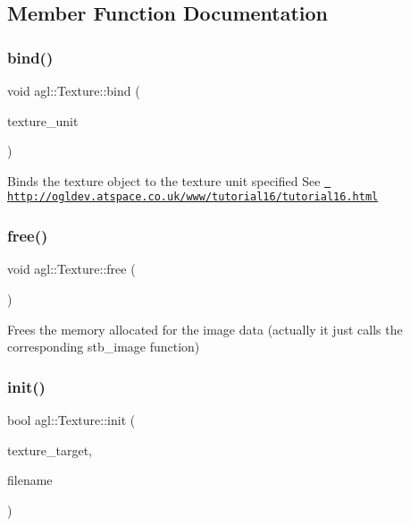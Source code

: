 \subsection{Member Function Documentation}
\mbox{\label{classagl_1_1Texture_a9f0f84d3edab9c07d0c1580e7647fbb9}} 
\subsubsection{\texorpdfstring{bind()}{bind()}}
{\footnotesize\ttfamily void agl\+::\+Texture\+::bind (\begin{DoxyParamCaption}\item[{G\+Lenum}]{texture\+\_\+unit }\end{DoxyParamCaption})}

Binds the texture object to the texture unit specified See \href{http://ogldev.atspace.co.uk/www/tutorial16/tutorial16.html}{\texttt{ http\+://ogldev.\+atspace.\+co.\+uk/www/tutorial16/tutorial16.\+html}} \mbox{\label{classagl_1_1Texture_aed12d98a17d4eeeb851cad6c81abbada}} 
\subsubsection{\texorpdfstring{free()}{free()}}
{\footnotesize\ttfamily void agl\+::\+Texture\+::free (\begin{DoxyParamCaption}{ }\end{DoxyParamCaption})\hspace{0.3cm}{\ttfamily [private]}}

Frees the memory allocated for the image data (actually it just calls the corresponding stb\+\_\+image function) \mbox{\label{classagl_1_1Texture_a1e6c013b0e7afb78c983c5553afa23f9}} 
\subsubsection{\texorpdfstring{init()}{init()}}
{\footnotesize\ttfamily bool agl\+::\+Texture\+::init (\begin{DoxyParamCaption}\item[{G\+Lenum}]{texture\+\_\+target,  }\item[{std\+::string}]{filename }\end{DoxyParamCaption})}

